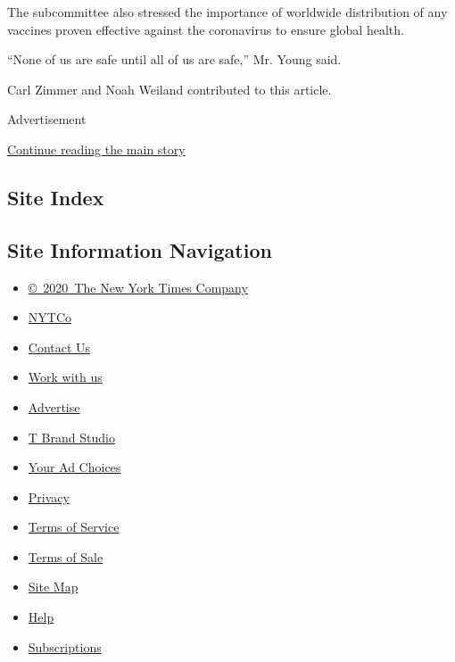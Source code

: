 The subcommittee also stressed the importance of worldwide distribution
of any vaccines proven effective against the coronavirus to ensure
global health.

``None of us are safe until all of us are safe,'' Mr. Young said.

Carl Zimmer and Noah Weiland contributed to this article.

Advertisement

\protect\hyperlink{after-bottom}{Continue reading the main story}

\hypertarget{site-index}{%
\subsection{Site Index}\label{site-index}}

\hypertarget{site-information-navigation}{%
\subsection{Site Information
Navigation}\label{site-information-navigation}}

\begin{itemize}
\tightlist
\item
  \href{https://help.nytimes3xbfgragh.onion/hc/en-us/articles/115014792127-Copyright-notice}{©~2020~The
  New York Times Company}
\end{itemize}

\begin{itemize}
\tightlist
\item
  \href{https://www.nytco.com/}{NYTCo}
\item
  \href{https://help.nytimes3xbfgragh.onion/hc/en-us/articles/115015385887-Contact-Us}{Contact
  Us}
\item
  \href{https://www.nytco.com/careers/}{Work with us}
\item
  \href{https://nytmediakit.com/}{Advertise}
\item
  \href{http://www.tbrandstudio.com/}{T Brand Studio}
\item
  \href{https://www.nytimes3xbfgragh.onion/privacy/cookie-policy\#how-do-i-manage-trackers}{Your
  Ad Choices}
\item
  \href{https://www.nytimes3xbfgragh.onion/privacy}{Privacy}
\item
  \href{https://help.nytimes3xbfgragh.onion/hc/en-us/articles/115014893428-Terms-of-service}{Terms
  of Service}
\item
  \href{https://help.nytimes3xbfgragh.onion/hc/en-us/articles/115014893968-Terms-of-sale}{Terms
  of Sale}
\item
  \href{https://spiderbites.nytimes3xbfgragh.onion}{Site Map}
\item
  \href{https://help.nytimes3xbfgragh.onion/hc/en-us}{Help}
\item
  \href{https://www.nytimes3xbfgragh.onion/subscription?campaignId=37WXW}{Subscriptions}
\end{itemize}
